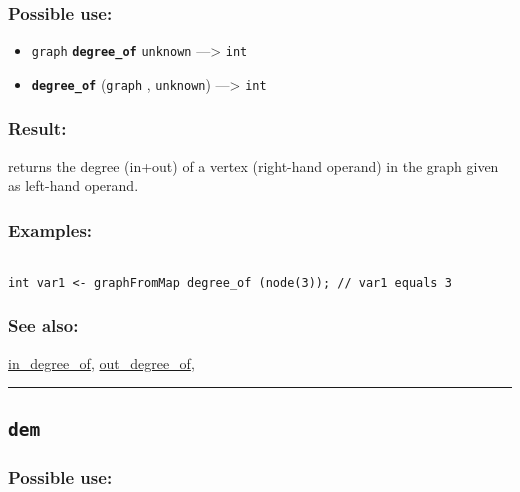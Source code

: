 \documentclass[]{book}
\providecommand{\tightlist}{%
  \setlength{\itemsep}{0pt}\setlength{\parskip}{0pt}}
\theoremstyle{definition}
\theoremstyle{definition}
\theoremstyle{definition}
\theoremstyle{remark}
\begin{document}
\subsubsection{Possible use:}\label{possible-use-127}

\begin{itemize}
\tightlist
\item
  \texttt{graph} \textbf{\texttt{degree\_of}} \texttt{unknown}
  ---\textgreater{} \texttt{int}
\item
  \textbf{\texttt{degree\_of}} (\texttt{graph} , \texttt{unknown})
  ---\textgreater{} \texttt{int}
\end{itemize}

\subsubsection{Result:}\label{result-123}

returns the degree (in+out) of a vertex (right-hand operand) in the
graph given as left-hand operand.

\subsubsection{Examples:}\label{examples-97}

\begin{verbatim}
 
int var1 <- graphFromMap degree_of (node(3)); // var1 equals 3
\end{verbatim}

\subsubsection{See also:}\label{see-also-76}

\href{OperatorsIM\#in_degree_of}{in\_degree\_of},
\href{OperatorsNR\#out_degree_of}{out\_degree\_of},

\begin{center}\rule{0.5\linewidth}{\linethickness}\end{center}

\subsection{\texorpdfstring{\texttt{dem}}{dem}}\label{dem}

\subsubsection{Possible use:}\label{possible-use-128}
\end{document}
